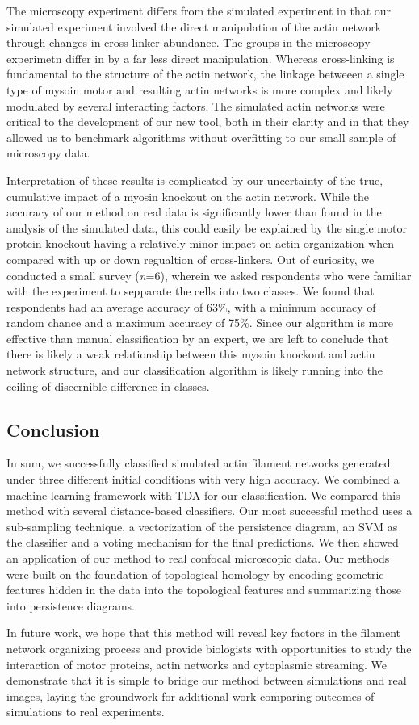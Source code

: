 \documentclass[10pt]{article}
\begin{document}
The microscopy experiment differs from the simulated experiment in that our simulated experiment involved the direct manipulation of the actin network through changes in cross-linker abundance. The groups in the microscopy experimetn differ in by a far less direct manipulation. Whereas cross-linking is fundamental to the structure of the actin network, the linkage betweeen a single type of mysoin motor and resulting actin networks is more complex and likely modulated by several interacting factors. The simulated actin networks were critical to the development of our new tool, both in their clarity and in that they allowed us to benchmark algorithms without overfitting to our small sample of microscopy data.

Interpretation of these results is complicated by our uncertainty of the true, cumulative impact of a myosin knockout on the actin network. While the accuracy of our method on real data is significantly lower than found in the analysis of the simulated data, this could easily be explained by the single motor protein knockout having a relatively minor impact on actin organization when compared with up or down regualtion of cross-linkers. Out of curiosity, we conducted a small survey (\textit{n}=6), wherein we asked respondents who were familiar with the experiment to sepparate the cells into two classes. We found that respondents had an average accuracy of 63\%, with a minimum accuracy of random chance and a maximum accuracy of 75\%. Since our algorithm is more effective than manual classification by an expert, we are left to conclude that there is likely a weak relationship between this mysoin knockout and actin network structure, and our classification algorithm is likely running into the ceiling of discernible difference in classes.

\subsection{Conclusion}
In sum, we successfully classified simulated actin filament networks generated under three different initial conditions with very high accuracy. We combined a machine learning framework with TDA for our classification. We compared this method with several distance-based classifiers. Our most successful method uses a sub-sampling technique, a vectorization of the persistence diagram, an SVM as the classifier and a voting mechanism for the final predictions. We then showed an application of our method to real confocal microscopic data. Our methods were built on the foundation of topological homology by encoding geometric features hidden in the data into the topological features and summarizing those into persistence diagrams.

In future work, we hope that this method will reveal key factors in the filament network organizing process and provide biologists with opportunities to study the interaction of motor proteins, actin networks and cytoplasmic streaming. We demonstrate that it is simple to bridge our method between simulations and real images, laying the groundwork for additional work comparing outcomes of simulations to real experiments.

\clearpage	


\end{document}
